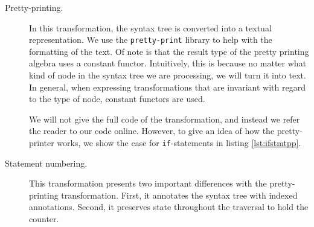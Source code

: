 \documentclass[letterpaper,11pt]{article}
\newcommand{\oatlab}{\textsc{Oatlab}}
\newcommand{\code}{\texttt}
\begin{document}
\begin{description}
    \item[Pretty-printing.]
        In this transformation, the syntax tree is converted into a textual
        representation. We use the \code{pretty-print} library to help with the
        formatting of the text. Of note is that the result type of the pretty
        printing algebra uses a constant functor. Intuitively, this is because
        no matter what kind of node in the syntax tree we are processing, we
        will turn it into text. In general, when expressing transformations
        that are invariant with regard to the type of node, constant functors
        are used.

        We will not give the full code of the transformation, and instead we
        refer the reader to our code online\footnotemark. However, to give an
        idea of how the pretty-printer works, we show the case for
        \code{if}-statements in listing \ref{lst:ifstmtpp}.

        

    \item[Statement numbering.]
        This transformation presents two important differences with the
        pretty-printing transformation. First, it annotates the syntax tree
        with indexed annotations. Second, it preserves state throughout the
        traversal to hold the counter.


\end{description}
\end{document}
